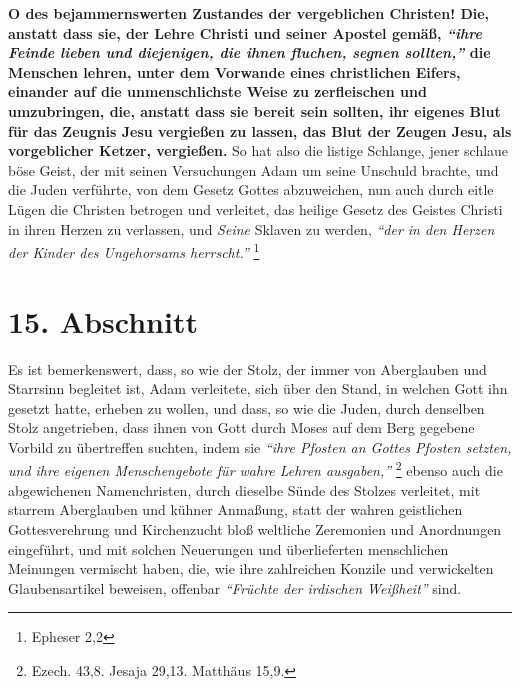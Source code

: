 \textbf{O des bejammernswerten Zustandes der vergeblichen Christen! Die, anstatt
dass
sie, der Lehre Christi und seiner Apostel gemäß,
\textit{"`ihre Feinde lieben und
diejenigen, die ihnen fluchen, segnen sollten,"'}
die Menschen lehren, unter dem
Vorwande eines christlichen Eifers, einander auf die unmenschlichste Weise zu
zerfleischen und umzubringen, die, anstatt
dass sie bereit sein sollten, ihr
eigenes Blut für das Zeugnis Jesu vergießen zu lassen, das Blut der Zeugen Jesu,
als vorgeblicher Ketzer, vergießen.} So hat also die
listige Schlange, jener
schlaue böse Geist, der mit seinen Versuchungen Adam um
seine Unschuld
brachte, und die Juden verführte, von dem Gesetz
Gottes abzuweichen, nun
auch durch eitle Lügen die Christen betrogen und
verleitet, das heilige
Gesetz des Geistes Christi in ihren Herzen zu
verlassen, und \textit{Seine}
Sklaven zu werden,
\textit{"`der in den Herzen der Kinder des Ungehorsams
herrscht."'}
\footnote{Epheser 2,2}

\section{15. Abschnitt} \label{kap7_ab15}

Es ist bemerkenswert, dass, so wie der Stolz, der immer von
Aberglauben und
Starrsinn begleitet ist, Adam verleitete,
sich über den Stand, in welchen
Gott ihn gesetzt hatte, erheben zu wollen, und dass, so wie die
Juden, durch
denselben Stolz angetrieben, dass ihnen von Gott durch
Moses auf dem Berg
gegebene Vorbild zu übertreffen suchten, indem sie
\textit{"`ihre Pfosten an Gottes
Pfosten setzten, und ihre eigenen Menschengebote für wahre Lehren
ausgaben,"'}
\footnote{Ezech. 43,8. Jesaja 29,13. Matthäus 15,9.}
ebenso auch die
abgewichenen Namenchristen, durch dieselbe Sünde
des Stolzes verleitet, mit
starrem Aberglauben und kühner Anmaßung, statt
der wahren geistlichen
Gottesverehrung und Kirchenzucht
bloß weltliche Zeremonien und Anordnungen
eingeführt, und mit solchen Neuerungen und überlieferten menschlichen Meinungen
vermischt haben, die, wie ihre zahlreichen Konzile  und
verwickelten
Glaubensartikel beweisen, offenbar
\textit{"`Früchte der irdischen Weißheit"'} sind.

